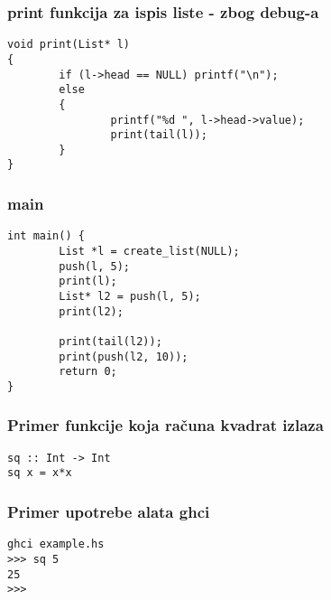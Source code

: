 \documentclass{beamer}
\begin{document}
\begin{frame}[fragile]
\frametitle{print funkcija za ispis liste - zbog debug-a}
\begin{lstlisting}
void print(List* l)
{
        if (l->head == NULL) printf("\n");
        else
        {
                printf("%d ", l->head->value);
                print(tail(l));
        }
}
\end{lstlisting}
\end{frame}

\begin{frame}
\frametitle{main}
\begin{lstlisting}
int main() {
        List *l = create_list(NULL);
        push(l, 5);
        print(l);
        List* l2 = push(l, 5);
        print(l2);

        print(tail(l2));
        print(push(l2, 10));
        return 0;
}
\end{lstlisting}
\end{frame}


\begin{frame}[fragile]
\frametitle{Primer funkcije koja računa kvadrat izlaza}
\begin{lstlisting}
sq :: Int -> Int
sq x = x*x
\end{lstlisting}
\end{frame}


\begin{frame}[fragile]
\frametitle{Primer upotrebe alata ghci}
\begin{lstlisting}
ghci example.hs 
>>> sq 5 
25
>>>
\end{lstlisting}
\end{frame}
\end{document}
